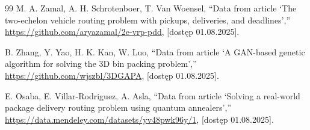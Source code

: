 \begin{thebibliography}{99}
M. A. Zamal, A. H. Schrotenboer, T. Van Woensel,
“Data from article ‘The two-echelon vehicle routing problem with pickups, deliveries, and deadlines’,”
\url{https://github.com/aryazamal/2e-vrp-pdd},
[dostęp 01.08.2025].

B. Zhang, Y. Yao, H. K. Kan, W. Luo,
“Data from article ‘A GAN-based genetic algorithm for solving the 3D bin packing problem’,”
\url{https://github.com/wjszbl/3DGAPA},
[dostęp 01.08.2025].

E. Osaba, E. Villar-Rodriguez, A. Asla,
“Data from article ‘Solving a real-world package delivery routing problem using quantum annealers’,”
\url{https://data.mendeley.com/datasets/yv48pwk96y/1},
[dostęp 01.08.2025].
\end{thebibliography}